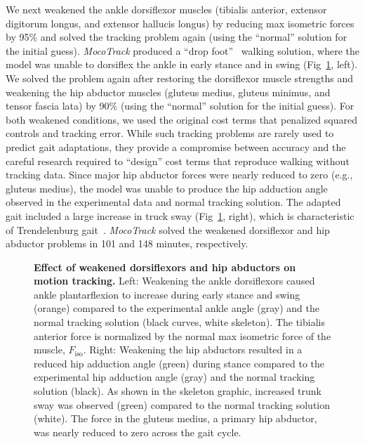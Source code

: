 \documentclass[10pt,letterpaper]{article}
\begin{document}
We next weakened the ankle dorsiflexor muscles (tibialis anterior, extensor digitorum longus, and extensor hallucis longus) by reducing max isometric forces by 95\% and solved the tracking problem again (using the ``normal'' solution for the initial guess). \textit{MocoTrack} produced a ``drop foot''~\cite{Perry:2010} walking solution, where the model was unable to dorsiflex the ankle in early stance and in swing (Fig~\ref{weakness}, left). We solved the problem again after restoring the dorsiflexor muscle strengths and weakening the hip abductor muscles (gluteus medius, gluteus minimus, and tensor fascia lata) by 90\% (using the ``normal'' solution for the initial guess). For both weakened conditions, we used the original cost terms that penalized squared controls and tracking error. While such tracking problems are rarely used to predict gait adaptations, they provide a compromise between accuracy and the careful research required to ``design'' cost terms that reproduce walking without tracking data. Since major hip abductor forces were nearly reduced to zero (e.g., gluteus medius), the model was unable to produce the hip adduction angle observed in the experimental data and normal tracking solution. The adapted gait included a large increase in truck sway (Fig~\ref{weakness}, right), which is characteristic of Trendelenburg gait~\cite{Falisse:2019b,Perry:2010}. \textit{MocoTrack} solved the weakened dorsiflexor and hip abductor problems in 101 and 148 minutes, respectively.

\begin{figure}[!h]
    \centering
    \caption{{\bf Effect of weakened dorsiflexors and hip abductors on motion tracking.}
        Left: Weakening the ankle dorsiflexors caused ankle plantarflexion to increase during early stance and swing (orange) compared to the experimental ankle angle (gray) and the normal tracking solution (black curves, white skeleton). The tibialis anterior force is normalized by the normal max isometric force of the muscle, $F_\mathrm{iso}$. Right: Weakening the hip abductors resulted in a reduced hip adduction angle (green) during stance compared to the experimental hip adduction angle (gray) and the normal tracking solution (black). As shown in the skeleton graphic, increased trunk sway was observed (green) compared to the normal tracking solution (white). The force in the gluteus medius, a primary hip abductor, was nearly reduced to zero across the gait cycle.
    }
    \label{weakness}
\end{figure}
\end{document}
